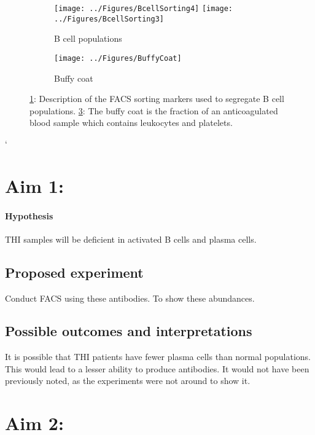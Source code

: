 \documentclass[12pt]{article}
\begin{document}
			
			
				\begin{figure}[tb]
					\centering
					\begin{subfigure}[b]{.7\textwidth}
						\flushleft
						\texttt{[image: ../Figures/BcellSorting4]}
						\texttt{[image: ../Figures/BcellSorting3]}
						\caption{B cell populations}
						\label{fig:BCellSorting}
					\end{subfigure}
					\begin{subfigure}[b]{0.29\textwidth}
						\centering
						\texttt{[image: ../Figures/BuffyCoat]}
						\caption{Buffy coat}
						\label{fig:BuffyCoat}
					\end{subfigure}
					\caption{\ref{fig:BCellSorting}: Description of the FACS sorting markers used to segregate B cell populations. \ref{fig:BuffyCoat}: The buffy coat is the fraction of an anticoagulated blood sample which contains leukocytes and platelets.}
				\end{figure}`
	
	\section{Aim 1:}
	
		\paragraph{Hypothesis} THI samples will be deficient in activated B cells and plasma cells. 
		
		\subsection{Proposed experiment}
			
			Conduct FACS using these antibodies. 
			To show these abundances. 
		
		\subsection{Possible outcomes and interpretations}		
		
			It is possible that THI patients have fewer plasma cells than normal populations. 
			This would lead to a lesser ability to produce antibodies. 
			It would not have been previously noted, as the experiments were not around to show it.
	
	
	\section{Aim 2:}
	
\end{document}
